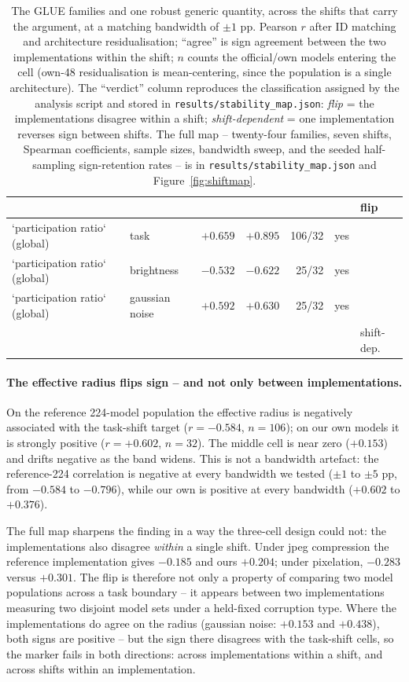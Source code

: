 \documentclass[10pt]{article}
\begin{document}
\begin{table}[t]
\begin{tabular}{@{}llrrrrl@{}}
 & & & & & & flip \\
\hline
`participation ratio` (global) & task & $+0.659$ & $+0.895$ & 106/32 & yes & \\
`participation ratio` (global) & brightness & $-0.532$ & $-0.622$ & 25/32 & yes & \\
`participation ratio` (global) & gaussian noise & $+0.592$ & $+0.630$ & 25/32 & yes & \\
 & & & & & & shift-dep. \\
\hline
\end{tabular}
\caption{The GLUE families and one robust generic quantity, across the shifts
that carry the argument, at a matching bandwidth of $\pm1$ pp. Pearson $r$
after ID matching and architecture residualisation; ``agree'' is sign
agreement between the two implementations within the shift; $n$ counts the
official/own models entering the cell (own-48 residualisation is
mean-centering, since the population is a single architecture). The
``verdict'' column reproduces the classification assigned by the analysis
script and stored in \texttt{results/stability\_map.json}: \emph{flip} = the
implementations disagree within a shift; \emph{shift-dependent} = one
implementation reverses sign between shifts. The full map -- twenty-four
families, seven shifts, Spearman coefficients, sample sizes, bandwidth sweep,
and the seeded half-sampling sign-retention rates -- is in
\texttt{results/stability\_map.json} and Figure~\ref{fig:shiftmap}.}
\label{tab:map}
\end{table}

\paragraph{The effective radius flips sign -- and not only between implementations.}
On the reference 224-model population the effective radius is negatively
associated with the task-shift target ($r=-0.584$, $n=106$); on our own models
it is strongly positive ($r=+0.602$, $n=32$). The middle cell is near zero
($+0.153$) and drifts negative as the band widens. This is not a bandwidth
artefact: the reference-224 correlation is negative at every bandwidth we
tested ($\pm1$ to $\pm5$ pp, from $-0.584$ to $-0.796$), while our own is
positive at every bandwidth ($+0.602$ to $+0.376$).

The full map sharpens the finding in a way the three-cell design could not:
the implementations also disagree \emph{within} a single shift. Under jpeg
compression the reference implementation gives $-0.185$ and ours $+0.204$;
under pixelation, $-0.283$ versus $+0.301$. The flip is therefore not only a
property of comparing two model populations across a task boundary -- it
appears between two implementations measuring two disjoint model sets under a
held-fixed corruption type. Where the implementations do agree on the radius
(gaussian noise: $+0.153$ and $+0.438$), both signs are positive -- but the
sign there disagrees with the task-shift cells, so the marker fails in both
directions: across implementations within a shift, and across shifts within an
implementation.
\end{document}
